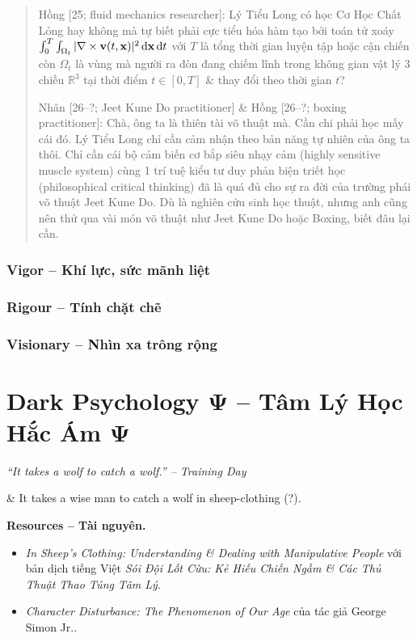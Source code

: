 \documentclass[12pt]{article}
\begin{document}
\begin{quote}
	{\sf Hồng [25; fluid mechanics researcher]}: Lý Tiểu Long có học Cơ Học Chất Lỏng hay không mà tự biết phải cực tiểu hóa hàm tạo bởi toán tử xoáy $\int_0^T\int_{\Omega_t} |\nabla\times{\bf v}(t,{\bf x})|^2\,{\rm d}{\bf x}\,{\rm d}t$ với $T$ là tổng thời gian luyện tập hoặc cận chiến còn $\Omega_t$ là vùng mà người ra đòn đang chiếm lĩnh trong không gian vật lý 3 chiều $\mathbb{R}^3$ tại thời điểm $t\in[0,T]$ \& thay đổi theo thời gian $t$?
	
	{\sf Nhân [26--?; Jeet Kune Do practitioner] \& Hồng [26--?; boxing practitioner]}: Chà, ông ta là thiên tài võ thuật mà. Cần chi phải học mấy cái đó. Lý Tiểu Long chỉ cần cảm nhận theo bản năng tự nhiên của ông ta thôi. Chỉ cần cái bộ cảm biến cơ bắp siêu nhạy cảm (highly sensitive muscle system) cùng 1 trí tuệ kiểu tư duy phản biện triết học (philosophical critical thinking) đã là quá đủ cho sự ra đời của trường phái võ thuật Jeet Kune Do. Dù là nghiên cứu sinh học thuật, nhưng anh cũng nên thử qua vài món võ thuật như Jeet Kune Do hoặc Boxing, biết đâu lại cần.
\end{quote}

\subsubsection{Vigor -- Khí lực, sức mãnh liệt}

\subsubsection{Rigour -- Tính chặt chẽ}

\subsubsection{Visionary -- Nhìn xa trông rộng}


\section{Dark Psychology $\boldsymbol{\Psi}$ -- Tâm Lý Học Hắc Ám $\boldsymbol{\Psi}$}

\begin{flushright}\it
	``It takes a wolf to catch a wolf.'' -- Training Day
\end{flushright}
\& It takes a wise man to catch a wolf in sheep-clothing (?).

\noindent\textbf{\textsf{Resources -- Tài nguyên.}}
\begin{itemize}
	\item {\it In Sheep's Clothing: Understanding \& Dealing with Manipulative People} \cite{Simon2010} với bản dịch tiếng Việt {\it Sói Đội Lốt Cừu: Kẻ Hiếu Chiến Ngầm \& Các Thủ Thuật Thao Túng Tâm Lý}.
	\item {\it Character Disturbance: The Phenomenon of Our Age} \cite{Simon2011} của tác giả {\rm George Simon Jr.}.
\end{itemize}
\end{document}
